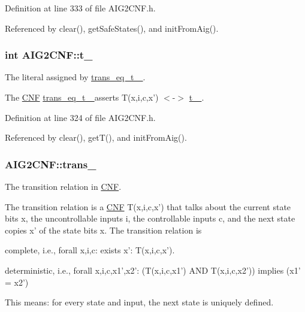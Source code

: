 Definition at line 333 of file A\-I\-G2\-C\-N\-F.\-h.



Referenced by clear(), get\-Safe\-States(), and init\-From\-Aig().

\hypertarget{classAIG2CNF_af2a7f6ecdcec3b5b2f37a11b0adde65a}{
\subsubsection[{t\-\_\-}]{\setlength{\rightskip}{0pt plus 5cm}int A\-I\-G2\-C\-N\-F\-::t\-\_\-\hspace{0.3cm}{\ttfamily [protected]}}}\label{classAIG2CNF_af2a7f6ecdcec3b5b2f37a11b0adde65a}


The literal assigned by \hyperlink{classAIG2CNF_af7e9b65092f626865a4aa541a48e4f1b}{trans\-\_\-eq\-\_\-t\-\_\- }. 

The \hyperlink{classCNF}{C\-N\-F} \hyperlink{classAIG2CNF_af7e9b65092f626865a4aa541a48e4f1b}{trans\-\_\-eq\-\_\-t\-\_\- } asserts T(x,i,c,x') $<$-\/$>$ \hyperlink{classAIG2CNF_af2a7f6ecdcec3b5b2f37a11b0adde65a}{t\-\_\- }. 

Definition at line 324 of file A\-I\-G2\-C\-N\-F.\-h.



Referenced by clear(), get\-T(), and init\-From\-Aig().

\hypertarget{classAIG2CNF_aedcb9a8efe69fe03721fdc17c5d11bfc}{
\subsubsection[{trans\-\_\-}]{ A\-I\-G2\-C\-N\-F\-::trans\-\_\-\hspace{0.3cm}{\ttfamily [protected]}}}\label{classAIG2CNF_aedcb9a8efe69fe03721fdc17c5d11bfc}


The transition relation in \hyperlink{classCNF}{C\-N\-F}. 

The transition relation is a \hyperlink{classCNF}{C\-N\-F} T(x,i,c,x') that talks about the current state bits x, the uncontrollable inputs i, the controllable inputs c, and the next state copies x' of the state bits x. The transition relation is 
\begin{DoxyItemize}
\item complete, i.\-e., forall x,i,c\-: exists x'\-: T(x,i,c,x'). 
\item deterministic, i.\-e., forall x,i,c,x1',x2'\-: (T(x,i,c,x1') A\-N\-D T(x,i,c,x2')) implies (x1' = x2') 
\end{DoxyItemize}This means\-: for every state and input, the next state is uniquely defined. 

